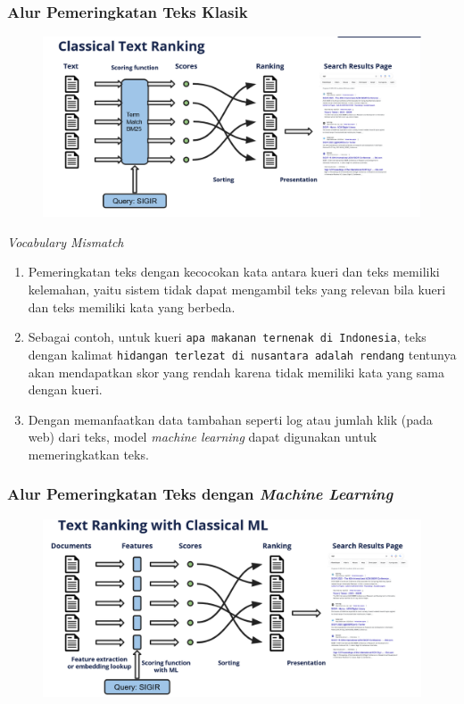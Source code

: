 \documentclass{beamer}
\newcommand{\f}[1]{\textit{#1}}
\newcommand{\code}[1]{\texttt{#1}}
\begin{document}
\frametitle{Alur Pemeringkatan Teks Klasik}
\begin{frame}
    \begin{figure}
        \centering
        \includegraphics[width=1\textwidth]{assets/pics/classical-IR.png}
    \end{figure}
\end{frame}

\begin{frame}{\f{Vocabulary Mismatch}}
    \begin{enumerate}
        \item Pemeringkatan teks dengan kecocokan kata antara kueri dan teks memiliki kelemahan, yaitu sistem tidak dapat mengambil teks yang relevan bila kueri dan teks memiliki kata yang berbeda.
        \item Sebagai contoh, untuk kueri \code{apa makanan ternenak di Indonesia}, teks dengan kalimat \code{hidangan terlezat di nusantara adalah rendang} tentunya akan mendapatkan skor yang rendah karena tidak memiliki kata yang sama dengan kueri.
        \item Dengan memanfaatkan data tambahan seperti log atau jumlah klik (pada web) dari teks, model \f{machine learning} dapat digunakan untuk memeringkatkan teks.
    \end{enumerate}
\end{frame}

\begin{frame}
\frametitle{Alur Pemeringkatan Teks dengan \f{Machine Learning}}
    \begin{figure}
        \centering
        \includegraphics[width=1\textwidth]{assets/pics/LTR-IR.png}
    \end{figure}
\end{frame}
\end{document}
